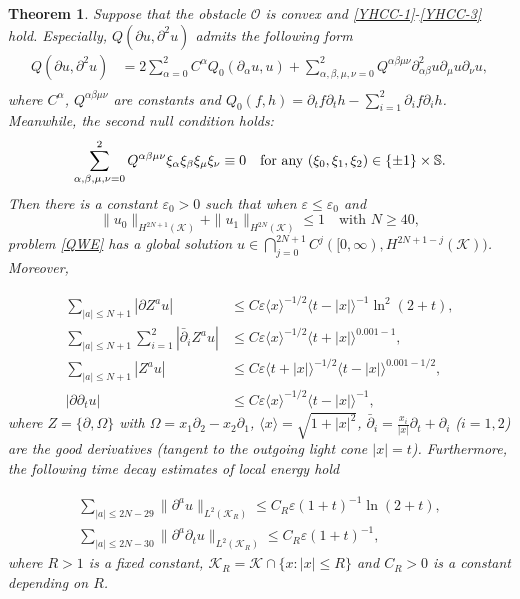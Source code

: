\documentclass[11pt,twoside]{article}
\def\cK{\mathcal K}
\def\cO{\mathcal O}
\def\SS{\mathop{\mathbb S\kern 0pt}\nolimits}
\def\ds{\displaystyle}
\def\p{\partial}
\def\ve{\varepsilon}
\newcommand{\w}[1]{\langle {#1} \rangle}
\theoremstyle{plain}
\newtheorem{theorem}{Theorem}[section]
\theoremstyle{definition}
\numberwithin{equation}{section}
\begin{document}
\begin{theorem}\label{thm2}
Suppose that the obstacle $\cO$ is convex and  \eqref{YHCC-1}-\eqref{YHCC-3} hold. Especially,
$Q(\p u,\p^2u)$ admits the following form
\begin{equation}\label{nonlinear-Chaplygin}
\begin{split}
Q(\p u,\p^2u)&=2\sum_{\alpha=0}^2C^{\alpha}Q_0(\p_{\alpha}u,u)+\sum_{\alpha,\beta,\mu,\nu=0}^2
Q^{\alpha\beta\mu\nu}\p^2_{\alpha\beta}u\p_{\mu}u\p_{\nu}u,\\
\end{split}
\end{equation}
where $C^{\alpha}$, $Q^{\alpha\beta\mu\nu}$ are constants and $\ds Q_0(f,h)=\p_tf\p_th-\sum_{i=1}^2\p_if\p_ih$.
Meanwhile, the second null condition holds:
\begin{equation}\label{null:condition}
\sum_{\alpha,\beta,\mu,\nu=0}^2Q^{\alpha\beta\mu\nu}\xi_{\alpha}\xi_{\beta}\xi_{\mu}\xi_{\nu}\equiv0\quad\text{for any  $(\xi_0,\xi_1,\xi_2)\in\{\pm1\}\times\SS$}.
\end{equation}
Then there is a constant $\ve_0>0$ such that when $\ve\le\ve_0$ and
\begin{equation}\label{initial:data}
\|u_0\|_{H^{2N+1}(\cK)}+\|u_1\|_{H^{2N}(\cK)}\le1 \quad\text{with $N\ge40$},
\end{equation}
problem \eqref{QWE} has a global solution $u\in\bigcap\limits_{j=0}^{2N+1}C^{j}([0,\infty), H^{2N+1-j}(\cK))$.
Moreover,
\addtocounter{equation}{1}
\begin{align}
\sum_{|a|\le N+1}|\p Z^au|&\le C\ve\w{x}^{-1/2}\w{t-|x|}^{-1}\ln^2(2+t),\tag{\theequation a}\label{thm2:decay:a}\\
\sum_{|a|\le N+1}\sum_{i=1}^2|\bar\p_iZ^au|&\le C\ve\w{x}^{-1/2}\w{t+|x|}^{0.001-1},\tag{\theequation b}\label{thm2:decay:b}\\
\sum_{|a|\le N+1}|Z^au|&\le C\ve\w{t+|x|}^{-1/2}\w{t-|x|}^{0.001-1/2},\tag{\theequation c}\label{thm2:decay:c}\\
|\p\p_tu|&\le C\ve\w{x}^{-1/2}\w{t-|x|}^{-1},\tag{\theequation d}\label{thm2:decay:d}
\end{align}
where $Z=\{\p,\Omega\}$ with $\Omega=x_1\p_2-x_2\p_1$, $\w{x}=\sqrt{1+|x|^2}$,  $\bar\p_i=\frac{x_i}{|x|}\p_t+\p_i$ ($i=1,2$)
are the good derivatives (tangent to the outgoing light cone $|x|=t$).
Furthermore, the following time decay estimates of local energy hold
\addtocounter{equation}{1}
\begin{align}
\sum_{|a|\le2N-29}\|\p^au\|_{L^2(\cK_R)}\le C_R\ve(1+t)^{-1}\ln(2+t),\tag{\theequation a}\label{thm2:decay:LE}\\
\sum_{|a|\le2N-30}\|\p^a\p_tu\|_{L^2(\cK_R)}\le C_R\ve(1+t)^{-1},\tag{\theequation b}\label{thm2:decay:LEdt}
\end{align}
where $R>1$ is a fixed constant, $\cK_R=\cK\cap\{x: |x|\le R\}$ and  $C_R>0$ is a constant
depending on $R$.
\end{theorem}
\end{document}
